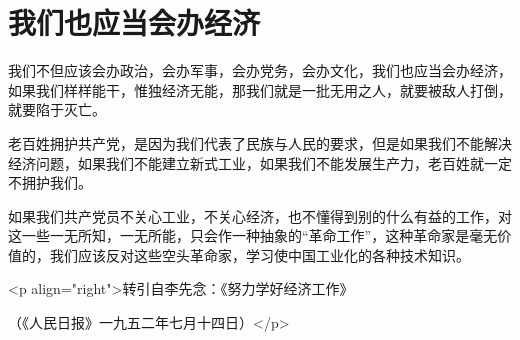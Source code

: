 \section[我们也应当会办经济（一九五二年七月）]{我们也应当会办经济}


我们不但应该会办政治，会办军事，会办党务，会办文化，我们也应当会办经济，如果我们样样能干，惟独经济无能，那我们就是一批无用之人，就要被敌人打倒，就要陷于灭亡。

老百姓拥护共产党，是因为我们代表了民族与人民的要求，但是如果我们不能解决经济问题，如果我们不能建立新式工业，如果我们不能发展生产力，老百姓就一定不拥护我们。

如果我们共产党员不关心工业，不关心经济，也不懂得到别的什么有益的工作，对这一些一无所知，一无所能，只会作一种抽象的“革命工作”，这种革命家是毫无价值的，我们应该反对这些空头革命家，学习使中国工业化的各种技术知识。

<p align="right">转引自李先念：《努力学好经济工作》

（《人民日报》一九五二年七月十四日）</p>


